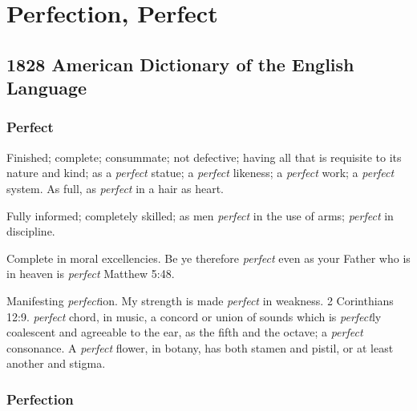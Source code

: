 \section{Perfection, Perfect}
	\label{PERFECTION}
	

\subsection{1828 American Dictionary of the English Language} %
	\label{PERFECTION-1828}
	
	\subsubsection{Perfect}

		\begin{compactitem}
			\item[1] Finished; complete; consummate; not defective; having all that is requisite to its nature and kind; as a \textit{perfect} statue; a \textit{perfect} likeness; a \textit{perfect} work; a \textit{perfect} system. As full, as \textit{perfect} in a hair as heart.
			\item[2] Fully informed; completely skilled; as men \textit{perfect} in the use of arms; \textit{perfect} in discipline.
			\item[3] Complete in moral excellencies. Be ye therefore \textit{perfect} even as your Father who is in heaven is \textit{perfect} Matthew 5:48.
			\item[4] Manifesting \textit{perfect}ion. My strength is made \textit{perfect} in weakness. 2 Corinthians 12:9. \textit{perfect} chord, in music, a concord or union of sounds which is \textit{perfect}ly coalescent and agreeable to the ear, as the fifth and the octave; a \textit{perfect} consonance. A \textit{perfect} flower, in botany, has both stamen and pistil, or at least another and stigma.
		\end{compactitem}
		
	\subsubsection{Perfection}


